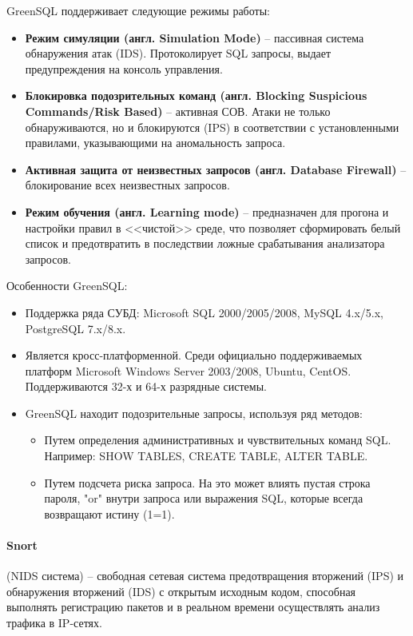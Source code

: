 GreenSQL поддерживает следующие режимы работы:
\begin{itemize}
	\item \textbf{Режим симуляции (англ. Simulation Mode)} -- пассивная система обнаружения 
	атак (IDS). Протоколирует SQL запросы, выдает предупреждения на консоль управления.

	\item \textbf{Блокировка подозрительных команд (англ. Blocking Suspicious Commands/Risk Based)} -- 
	активная СОВ. Атаки не только обнаруживаются, но и блокируются (IPS) в соответствии с 
	установленными правилами, указывающими на аномальность запроса.

	\item \textbf{Активная защита от неизвестных запросов (англ. Database Firewall)} -- 
	блокирование всех неизвестных запросов.

	\item \textbf{Режим обучения (англ. Learning mode)} -- предназначен для прогона и 
	настройки правил в <<чистой>> среде, что позволяет сформировать белый список и 
	предотвратить в последствии ложные срабатывания анализатора запросов.
\end{itemize}

Особенности GreenSQL:
\begin{itemize}
	\item Поддержка ряда СУБД: Microsoft SQL 2000/2005/2008, MySQL 4.x/5.x, PostgreSQL 7.x/8.x. 
	
	\item Является кросс-платформенной. Среди официально поддерживаемых платформ Microsoft 
	Windows Server 2003/2008, Ubuntu, CentOS. Поддерживаются 32-х и 64-х разрядные системы.

	\item GreenSQL находит подозрительные запросы, используя ряд методов: 
	\begin{itemize}
		\item Путем определения административных и чувствительных команд SQL. 
		Например: SHOW TABLES, CREATE TABLE, ALTER TABLE.

		\item Путем подсчета риска запроса. На это может влиять пустая строка пароля, "or" 
		внутри запроса или выражения SQL, которые всегда возвращают истину (1=1).
	\end{itemize}

\end{itemize}


\paragraph*{Snort} (NIDS система) -- свободная сетевая система предотвращения вторжений (IPS) 
и обнаружения вторжений (IDS) с открытым исходным кодом, способная выполнять регистрацию 
пакетов и в реальном времени осуществлять анализ трафика в IP-сетях. 

